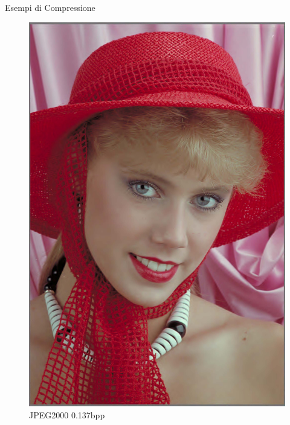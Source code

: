 \begin{frame}{Esempi di Compressione}
\begin{figure}[!ht]
\begin{minipage}[]{0.13\linewidth}
                \includegraphics[width=\textwidth]{Immagini/IMAGES/JPEG2000_1_IMG0004.pdf}
                \caption{JPEG2000 0.137bpp}
                \label{fig:ExampleJPEG2000}
            \end{minipage}
            \begin{minipage}[]{0.13\linewidth}
                \centering

\end{minipage}
\end{figure}
\end{frame}
